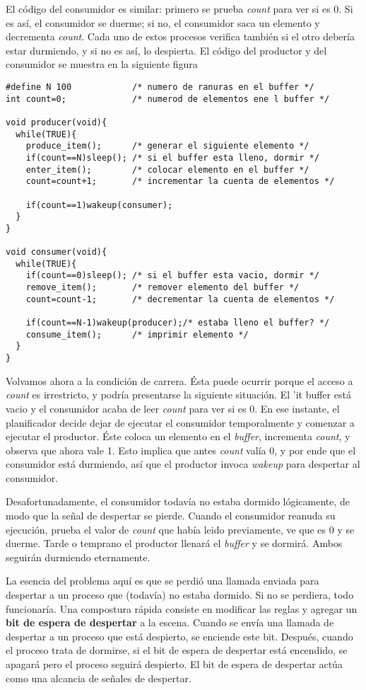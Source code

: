 \documentclass{article}
\begin{document}
El c\'odigo del consumidor es similar: primero se prueba {\it count} 
para ver si es 0. Si es as\'i, el consumidor se duerme; si no, el 
consumidor saca un elemento y decrementa {\it count}. Cada uno de estos 
procesos verifica tambi\'en si el otro deber\'ia estar durmiendo, y si 
no es as\'i, lo despierta. El c\'odigo del productor y del consumidor 
se muestra en la siguiente figura
\begin{verbatim}
#define N 100            /* numero de ranuras en el buffer */
int count=0;             /* numerod de elementos ene l buffer */

void producer(void){
  while(TRUE){
    produce_item();      /* generar el siguiente elemento */
    if(count==N)sleep(); /* si el buffer esta lleno, dormir */
    enter_item();        /* colocar elemento en el buffer */
    count=count+1;       /* incrementar la cuenta de elementos */

    if(count==1)wakeup(consumer);
  }
}

void consumer(void){
  while(TRUE){
    if(count==0)sleep(); /* si el buffer esta vacio, dormir */
    remove_item();       /* remover elemento del buffer */
    count=count-1;       /* decrementar la cuenta de elementos */

    if(count==N-1)wakeup(producer);/* estaba lleno el buffer? */
    consume_item();      /* imprimir elemento */
  }
}
\end{verbatim}
Volvamos ahora a la condici\'on de carrera. \'Esta puede ocurrir 
porque el acceso a {\it count} es irrestricto, y podr\'ia presentarse 
la siguiente situaci\'on. El {'it buffer} est\'a vacio y el consumidor 
acaba de leer {\it count} para ver si es 0. En ese instante, el 
planificador decide dejar de ejecutar el consumidor temporalmente y 
comenzar a ejecutar el productor. \'Este coloca un elemento en el 
{\it buffer}, incrementa {\it count}, y observa que ahora vale 1. 
Esto implica que antes {\it count} val\'ia 0, y por ende que el 
consumidor est\'a durmiendo, as\'i que el productor invoca {\it wakeup} 
para despertar al consumidor.

Desafortunadamente, el consumidor todav\'ia no estaba dormido 
l\'ogicamente, de modo que la se\~nal de despertar se pierde. Cuando el 
consumidor reanuda su ejecuci\'on, prueba el valor de {\it count} que 
hab\'ia leido previamente, ve que es 0 y se duerme. Tarde o temprano 
el productor llenar\'a el {\it buffer} y se dormir\'a. Ambos seguir\'an 
durmiendo eternamente. 

La esencia del problema aqu\'i es que se perdi\'o una llamada enviada 
para despertar a un proceso que (todav\'ia) no estaba dormido. Si no 
se perdiera, todo funcionar\'ia. Una compostura r\'apida consiste en 
modificar las reglas y agregar un {\bf bit de espera de despertar} a 
la escena. Cuando se env\'ia una llamada de despertar a un proceso que 
est\'a despierto, se enciende este bit. Despu\'es, cuando el proceso 
trata de dormirse, si el bit de espera de despertar est\'a encendido, 
se apagar\'a pero el proceso seguir\'a despierto. El bit de espera 
de despertar act\'ua como una alcancia de se\~nales de despertar.
\end{document}
